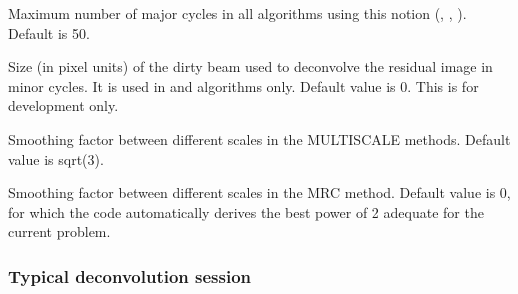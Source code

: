 \begin{description}\itemsep 0pt
\item[\sicvar{CLEAN\_NCYCLE}] Maximum number of major cycles in all algorithms
  using this notion (, , ). Default is 50.
\item[\sicvar{BEAM\_PATCH}] Size (in pixel units) of the dirty beam used to
  deconvolve the residual image in minor cycles. It is used in  and 
   algorithms only. Default value is 0. This is for development only.
\item[\sicvar{CLEAN\_SMOOTH}] Smoothing factor between different scales in 
the MULTISCALE methods. Default value is sqrt(3).
\item[\sicvar{CLEAN\_RATIO}] Smoothing factor between different scales in 
the MRC method. Default value is 0, for which the code automatically
derives the best power of 2 adequate for the current problem.
\end{description}

\subsubsection{Typical deconvolution session}

